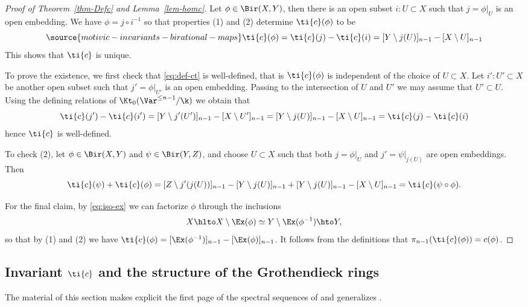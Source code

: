 \begin{proof}[Proof of Theorem~\ref{thm-Defc} and
Lemma~\ref{lem-homc}]

Let $\phi \in \Bir(X, Y)$, then there is an open subset $i: U \subset X$
such that $j = \phi|_U$ is an open embedding. We have $\phi = j \circ i^{-1}$
so that properties (1) and (2) determine $\ti{c}(\phi)$ to be
\begin{equation}\label{eq:def-ct}
\source{motivic-invariants-birational-maps}
    \ti{c}(\phi) = \ti{c}(j) - \ti{c}(i) = [Y \setminus j(U)]_{n-1} - [X \setminus U]_{n-1}
\end{equation}
This shows that $\ti{c}$ is unique.

To prove the existence,
we first check that \eqref{eq:def-ct} is well-defined, that is $\ti{c}(\phi)$
is independent of
the choice of $U \subset X$. Let $i': U' \subset X$ be another open subset
such that $j' = \phi|_{U'}$ is an open embedding.
Passing to the intersection of
$U$ and $U'$ we may assume that $U' \subset U$.
Using the defining relations of $\Kt_0(\Var^{\le n-1}/\k)$
we obtain that
\[
\ti{c}(j') - \ti{c}(i') = [Y \setminus j'(U')]_{n-1} - [X \setminus U']_{n-1} =
[Y \setminus j(U)]_{n-1} - [X \setminus U]_{n-1} =
\ti{c}(j) - \ti{c}(i)
\]
hence $\ti{c}$ is well-defined.

To check (2), let $\phi \in \Bir(X, Y)$ and $\psi \in \Bir(Y,Z)$,
and choose $U \subset X$ such that both $j = \phi|_U$ and
$j'= \psi|_{j(U)}$ are open embeddings. Then
$$\ti{c}(\psi) + \ti{c}(\phi)
= [Z \setminus j'(j(U))]_{n-1} - [Y \setminus j(U)]_{n-1}  +
[Y \setminus j(U)]_{n-1} - [X \setminus U]_{n-1} = \ti{c}(\psi
\circ \phi).$$

For the final claim, by \eqref{eq:iso-ex} we can factorize $\phi$ through
the inclusions
\[
X \hlto X \setminus \Ex(\phi) \simeq Y \setminus \Ex(\phi^{-1}) \hto Y,
\]
so that by (1) and (2) we have
$\ti{c}(\phi) = [\Ex(\phi^{-1})]_{n-1} - [\Ex(\phi)]_{n-1}$.
It follows from the definitions that $\pi_{n-1}(\ti{c}(\phi)) = c(\phi)$.
\end{proof}

\subsection{Invariant $\ti{c}$ and
the structure of the Grothendieck rings}


The material of this section makes explicit
the first page of
the spectral sequences of
\cite[Section 3]{Zakharevich}
and generalizes \cite[\S 3.2]{LSZ20}.

